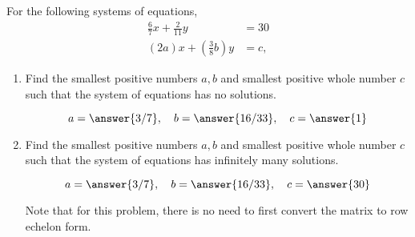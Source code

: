 \documentclass{ximera}
\author{Parisa Fatheddin}
\begin{document}
\begin{exercise}
For the following systems of equations,
\begin{align*}
\frac{6}{7} x + \frac{2}{11}y &= 30\\
(2a) x + \left(\frac{3}{8} b\right) y &= c,
\end{align*}
\begin{enumerate}
\item Find the smallest positive numbers $a,b$ and smallest positive
  whole number $c$ such that the system of equations has no solutions.
\begin{prompt}
  \[
  a= \answer{3/7}, \quad b= \answer{16/33}, \quad c=\answer{1}
  \]
 \end{prompt}

\item Find the smallest positive numbers $a,b$ and smallest positive
  whole number $c$ such that the system of equations has infinitely
  many solutions.
\begin{prompt}
  \[
  a= \answer{3/7}, \quad b= \answer{16/33}, \quad c = \answer{30}
  \]
\end{prompt}
\begin{hint}
 Note that for this problem, there is no need to first convert the matrix to row echelon form.
\end{hint}
\end{enumerate}
\end{exercise}
\end{document}
